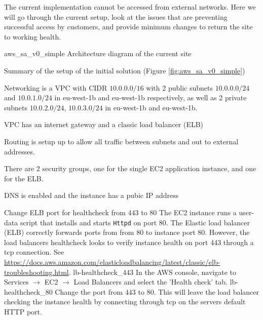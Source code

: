 \FloatBarrier


The current implementation cannot be accessed from external networks. Here we will go through the current setup, look at the issues that are preventing successful access by customers, and provide minimum changes to return the site to working health.

\architecture
{aws_sa_v0_simple}
{Architecture diagram of the current site}
	\FloatBarrier
	
\changes
{Summary of the setup of the initial solution (Figure \ref{fig:aws_sa_v0_simple})}
{
	\item Networking is a VPC with CIDR $10.0.0.0/16$ with 2 public subnets $10.0.0.0/24$ and  $10.0.1.0/24$ in eu-west-1b and eu-west-1b respectively, as well as 2 private subnets $10.0.2.0/24$, $10.0.3.0/24$ in eu-west-1b and eu-west-1b. 

	\item VPC has an internet gateway and a classic load balancer (ELB)
	
	\item Routing is setup up to allow all traffic between subnets and out to external addresses.
	
	\item There are 2 security groups, one for the single EC2 application instance, and one for the ELB.
	
	\item DNS is enabled and the instance has a pubic IP address
}



{Change ELB port for healthcheck from 443 to 80}
{
	The EC2 instance runs a user-data script that installs and starts \texttt{Httpd} on port $80$. The Elastic load balancer (ELB) correctly forwards ports
	from from 80 to instance port $80$. However, the load balancers healthcheck looks to verify instance health on port 443 through a tcp connection. See 	\url{https://docs.aws.amazon.com/elasticloadbalancing/latest/classic/elb-troubleshooting.html}.
}
{
	\imagefigsinglebox
	{lb-healthcheck_443}
	{In the AWS console, navigate to Services  $\rightarrow$ EC2  $\rightarrow$ Load Balancers and select the 'Health check' tab.}
	\imagefigsinglebox
	{lb-healthcheck_80}
	{Change the port from $443$ to $80$. This will leave the load balancer checking the instance health by connecting through tcp on the servers default HTTP port.}
}
\FloatBarrier


